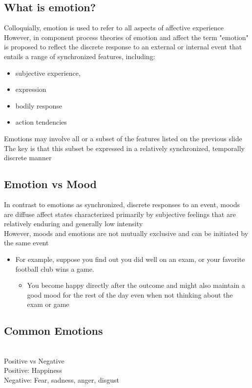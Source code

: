 \subsection{What is emotion?}
Colloquially, emotion is used to refer to all aspects of affective experience
\\However, in component process theories of emotion and affect the term "emotion" is proposed to reflect the discrete response to an external or internal event that entails a range of synchronized features, including:
\begin{itemize}
    \item subjective experience,
    \item expression
    \item bodily response
    \item action tendencies
\end{itemize}
Emotions may involve all or a subset of the features listed on the previous slide
\\The key is that this subset be expressed in a relatively synchronized, temporally discrete manner
\subsection{Emotion vs Mood}
In contrast to emotions as synchronized, discrete responses to an event, moods are diffuse affect states characterized primarily by subjective feelings that are relatively enduring and generally low intensity
\\However, moods and emotions are not mutually exclusive and can be initiated by the same event
\begin{itemize}
    \item For example, suppose you find out you did well on an exam, or your favorite football club wins a game.
    \begin{itemize}
        \item You become happy directly after the outcome and might also maintain a good mood for the rest of the day even when not thinking about the exam or game
    \end{itemize}
\end{itemize}
\subsection{Common Emotions}
\\Positive vs Negative
\\Positive: Happiness
\\Negative: Fear, sadness, anger, disgust

